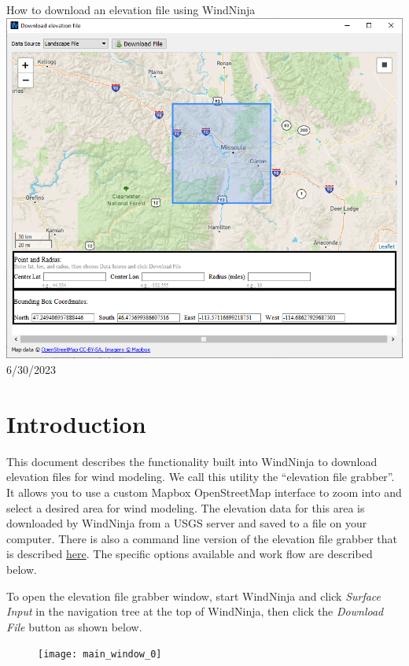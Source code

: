 \documentclass[12pt]{article}
\begin{document}
\begin{titlepage}
    \centering
    {\Huge
       How to download an elevation file using WindNinja
    }    
    \vfill
    \includegraphics[scale=0.75]{dem_download_0}
    \vfill
  	{\Huge
	  6/30/2023 %
  	}
    \vfill
\end{titlepage}


\section*{Introduction}
This document describes the functionality built into WindNinja to download
elevation files for wind modeling.  We call this utility the “elevation file
grabber”.  It allows you to use a custom \textcopyright Mapbox \textcopyright OpenStreetMap interface to zoom into
and select a desired area for wind modeling. The elevation data for this area
is downloaded by WindNinja from a USGS server and saved to a file on your
computer.  There is also a command line version of the elevation file grabber
that is described \href{https://weather.firelab.org/windninja/tutorials/fetch_dem_instructions.pdf}{here}.  The specific
options available and work flow are described below.

To open the elevation file grabber window, start WindNinja and click \textit{Surface Input} in the navigation tree at the top of WindNinja, then click the \textit{Download File} button as shown below.

\begin{figure}[H]
	\centering
	\label{}
	\texttt{[image: main\_window\_0]}
\end{figure}
\newpage
\end{document}
